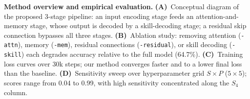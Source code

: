 \caption{\textbf{Method overview and empirical evaluation.}
\textbf{(A)}~Conceptual diagram of the proposed 3-stage pipeline: an input encoding stage feeds an attention-and-memory stage, whose output is decoded by a skill-decoding stage; a residual skip connection bypasses all three stages.
\textbf{(B)}~Ablation study: removing attention (\texttt{-attn}), memory (\texttt{-mem}), residual connections (\texttt{-residual}), or skill decoding (\texttt{-skill}) each degrades accuracy relative to the full model (64.7\%).
\textbf{(C)}~Training loss curves over 30k steps; our method converges faster and to a lower final loss than the baseline.
\textbf{(D)}~Sensitivity sweep over hyperparameter grid $S \times P$ ($5\times5$); scores range from 0.04 to 0.99, with high sensitivity concentrated along the $S_4$ column.}
